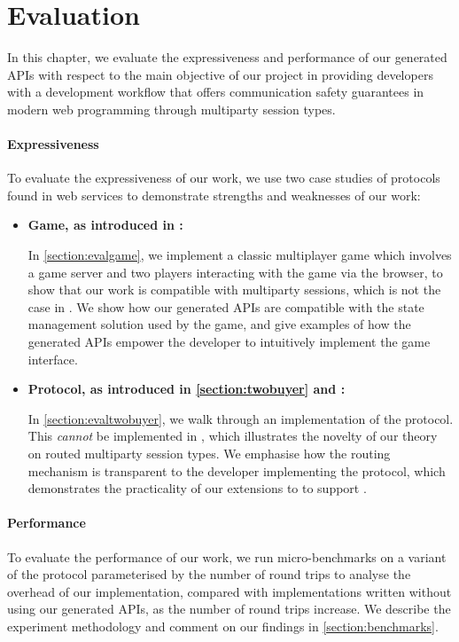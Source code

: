 \chapter{Evaluation}
\label{chap:eval}

In this chapter, we
evaluate the expressiveness
and performance of our generated APIs
with respect to the main objective of
our project in
providing
developers with a development workflow
that offers communication safety guarantees in modern
web programming through multiparty session types.

\subsubsection{Expressiveness}
To evaluate the expressiveness
of our work,
we use two case studies
of protocols found in web services
to demonstrate strengths and weaknesses
of our work:

\begin{itemize}

\item
\textbf{ Game, as introduced
in \cite{PLACES2020}:}

In \cref{section:evalgame},
we implement a classic multiplayer game which involves a game server
and two players interacting with the game via the browser,
to show that our work is compatible with multiparty sessions,
which is not the case in \cite{MVU2020,Exceptional}.
We show how our generated APIs are compatible with the
state management solution used by the game, and give examples of 
how the generated APIs empower the developer to intuitively 
implement the game interface.

\item
\textbf{ Protocol, as introduced in 
\cref{section:twobuyer} and \cite{JACM2016,MPAST}:}

In \cref{section:evaltwobuyer},
we walk through an implementation of the 
protocol. This \textit{cannot} be implemented in
\cite{PureScript2019,MVU2020,Exceptional}, 
which illustrates the novelty
of our \newtheory theory on routed multiparty session types.
We emphasise how the routing mechanism is transparent to the
developer implementing the protocol, which demonstrates
the practicality of our extensions to \codegen to support
\newtheory.

\end{itemize}

\subsubsection{Performance}
To evaluate the performance of our work,
we run micro-benchmarks
on a variant of the 
protocol parameterised by the number
of round trips
to analyse the overhead of our implementation,
compared with implementations written
without using our generated APIs,
as the number of round trips increase.
We describe the experiment methodology
and comment on our findings in \cref{section:benchmarks}.

